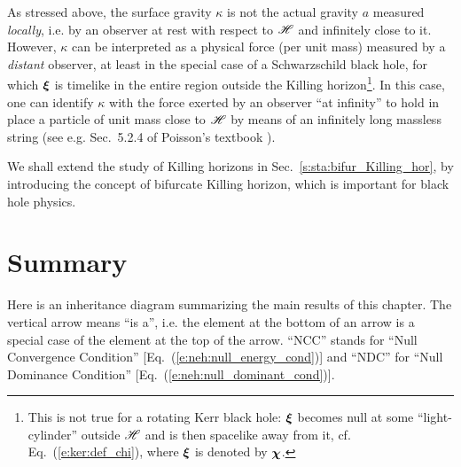 \begin{remark}
As stressed above, the surface gravity $\kappa$ is not the
actual gravity $a$ measured \emph{locally}, i.e. by an observer at rest with
respect to $\mathscr{H}$ and infinitely close to it. However, $\kappa$ can be interpreted
as a physical force (per unit mass) measured by a \emph{distant} observer,
at least in the special case of a Schwarzschild black hole, for which
$\bm{\xi}$ is timelike in the entire region outside the Killing horizon\footnote{This is not true for a rotating Kerr black hole:
$\bm{\xi}$ becomes null at some ``light-cylinder'' outside $\mathscr{H}$ and is then
spacelike away from it, cf. Eq.~(\ref{e:ker:def_chi}),
where $\bm{\xi}$ is denoted by $\bm{\chi}$.}. In this case, one can identify $\kappa$
with the force exerted by an observer ``at infinity'' to hold in place a particle
of unit mass close to $\mathscr{H}$ by means of an infinitely long massless string
(see e.g. Sec.~5.2.4 of Poisson's textbook \cite{Poiss04}).
\end{remark}

\begin{remark}
We shall extend the study of Killing horizons in Sec.~\ref{s:sta:bifur_Killing_hor},
by introducing the concept of bifurcate Killing horizon, which is important
for black hole physics.
\end{remark}


\section{Summary}

Here is an inheritance diagram summarizing the main results of this chapter.
The vertical arrow means ``is a'', i.e. the element at the bottom of an arrow
is a special case of the element at the top of the arrow.
``NCC'' stands for ``Null Convergence Condition'' [Eq.~(\ref{e:neh:null_energy_cond})]
and ``NDC'' for ``Null Dominance Condition'' [Eq.~(\ref{e:neh:null_dominant_cond})].


